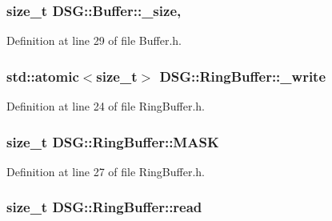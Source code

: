 \hypertarget{classDSG_1_1Buffer_a4e2fef9ed617af2554b25c999def8f71}{
\subsubsection[{\+\_\+size}]{\setlength{\rightskip}{0pt plus 5cm}size\+\_\+t D\+S\+G\+::\+Buffer\+::\+\_\+size\hspace{0.3cm}{\ttfamily [protected]}, {\ttfamily [inherited]}}}\label{classDSG_1_1Buffer_a4e2fef9ed617af2554b25c999def8f71}


Definition at line 29 of file Buffer.\+h.

\hypertarget{classDSG_1_1RingBuffer_a78bd7704fd059b745bc82421e1062123}{
\subsubsection[{\+\_\+write}]{\setlength{\rightskip}{0pt plus 5cm}std\+::atomic$<$size\+\_\+t$>$ D\+S\+G\+::\+Ring\+Buffer\+::\+\_\+write\hspace{0.3cm}{\ttfamily [protected]}}}\label{classDSG_1_1RingBuffer_a78bd7704fd059b745bc82421e1062123}


Definition at line 24 of file Ring\+Buffer.\+h.

\hypertarget{classDSG_1_1RingBuffer_a2fba2ff6ee3886101f0f58b0fd7f3641}{
\subsubsection[{M\+A\+S\+K}]{\setlength{\rightskip}{0pt plus 5cm}size\+\_\+t D\+S\+G\+::\+Ring\+Buffer\+::\+M\+A\+S\+K\hspace{0.3cm}{\ttfamily [protected]}}}\label{classDSG_1_1RingBuffer_a2fba2ff6ee3886101f0f58b0fd7f3641}


Definition at line 27 of file Ring\+Buffer.\+h.

\hypertarget{classDSG_1_1RingBuffer_a34bc659c286c8913e318c0e8c0777204}{
\subsubsection[{read}]{\setlength{\rightskip}{0pt plus 5cm}size\+\_\+t D\+S\+G\+::\+Ring\+Buffer\+::read\hspace{0.3cm}{\ttfamily [protected]}}}\label{classDSG_1_1RingBuffer_a34bc659c286c8913e318c0e8c0777204}


